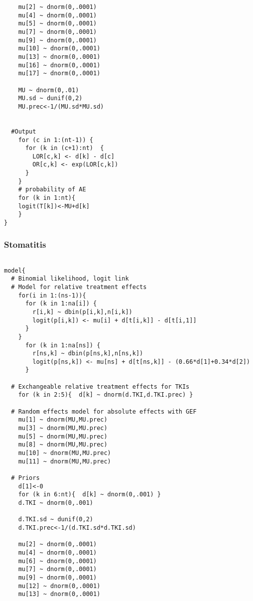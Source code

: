 \documentclass[11pt,final,fleqn]{article}\usepackage[]{graphicx}\usepackage[]{color}
\theoremstyle{plain}
\begin{document}
\begin{appendices}
\begin{verbatim}
    mu[2] ~ dnorm(0,.0001)                     
    mu[4] ~ dnorm(0,.0001)                       
    mu[5] ~ dnorm(0,.0001)                       
    mu[7] ~ dnorm(0,.0001)                       
    mu[9] ~ dnorm(0,.0001)
    mu[10] ~ dnorm(0,.0001)
    mu[13] ~ dnorm(0,.0001)
    mu[16] ~ dnorm(0,.0001)
    mu[17] ~ dnorm(0,.0001)
      
    MU ~ dnorm(0,.01)                        
    MU.sd ~ dunif(0,2) 
    MU.prec<-1/(MU.sd*MU.sd)
    
      
  #Output                                     
    for (c in 1:(nt-1)) {                        
      for (k in (c+1):nt)  { 
        LOR[c,k] <- d[k] - d[c]
        OR[c,k] <- exp(LOR[c,k])
      }  
    }
    # probability of AE
    for (k in 1:nt){ 
    logit(T[k])<-MU+d[k]
    }
}

\end{verbatim}

\subsubsection{Stomatitis} 
\begin{verbatim} 

model{
  # Binomial likelihood, logit link
  # Model for relative treatment effects
    for(i in 1:(ns-1)){                 
      for (k in 1:na[i]) {               
        r[i,k] ~ dbin(p[i,k],n[i,k])     
        logit(p[i,k]) <- mu[i] + d[t[i,k]] - d[t[i,1]]  
      }
    }   
      for (k in 1:na[ns]) {               
        r[ns,k] ~ dbin(p[ns,k],n[ns,k])     
        logit(p[ns,k]) <- mu[ns] + d[t[ns,k]] - (0.66*d[1]+0.34*d[2])  
      }
  
  # Exchangeable relative treatment effects for TKIs
    for (k in 2:5){  d[k] ~ dnorm(d.TKI,d.TKI.prec) }
  
  # Random effects model for absolute effects with GEF
    mu[1] ~ dnorm(MU,MU.prec) 
    mu[3] ~ dnorm(MU,MU.prec) 
    mu[5] ~ dnorm(MU,MU.prec) 
    mu[8] ~ dnorm(MU,MU.prec) 
    mu[10] ~ dnorm(MU,MU.prec) 
    mu[11] ~ dnorm(MU,MU.prec)
       
  # Priors
    d[1]<-0                                      
    for (k in 6:nt){  d[k] ~ dnorm(0,.001) }    
    d.TKI ~ dnorm(0,.001)
    
    d.TKI.sd ~ dunif(0,2) 
    d.TKI.prec<-1/(d.TKI.sd*d.TKI.sd)
    
    mu[2] ~ dnorm(0,.0001)                     
    mu[4] ~ dnorm(0,.0001)                       
    mu[6] ~ dnorm(0,.0001)                       
    mu[7] ~ dnorm(0,.0001)                       
    mu[9] ~ dnorm(0,.0001)
    mu[12] ~ dnorm(0,.0001)
    mu[13] ~ dnorm(0,.0001)


\end{verbatim}
\end{appendices}
\end{document}
